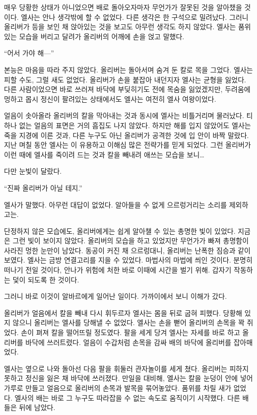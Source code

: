 매우 당황한 상태가 아니었으면 배로 돌아오자마자 무언가가 잘못된 것을 알아챘을 것이다. 엘사는 안나 생각밖에 할 수 없었다. 다른 생각은 한 구석으로 밀려났다. 그러니 올리버가 등을 보인 채 앉아있는 것을 보고도 아무런 생각도 하지 않았다. 엘사는 품위 있는 모습을 버리고 달려가 올리버의 어깨에 손을 얹고 말했다.

``어서 가야 해—''

본능은 마음을 따라 주지 않았다. 올리버는 돌아서며 숨겨 둔 칼로 목을 그었다. 엘사는 피할 수도, 그럴 새도 없었다. 올리버가 손을 붙잡아 내던지자 엘사는 균형을 잃었다. 다른 사람이었으면 바로 쓰러져 바닥에 부딪히기도 전에 목숨을 잃었겠지만, 두려움에 멍하고 몹시 정신이 팔려있는 상태에서도 엘사는 여전히 엘사 여왕이었다.

얼음이 솟아올라 올리버의 칼을 막아내는 것과 동시에 엘사는 비틀거리며 물러났다. 티 하나 없는 얼음의 표면은 거의 흠집도 나지 않았다. 하지만 해를 입지 않았어도 엘사는 죽을 지경에 이른 것과, 다른 누구도 아닌 올리버가 공격한 것에 입 안이 바짝 말랐다. 지난 며칠 동안 엘사는 이 유용하고 이해심 많은 전략가를 믿게 되었다. 그런 올리버가 이런 때에 엘사를 죽이려 드는 것과 칼을 빼내려 애쓰는 모습을 보니\ldots

다만 눈빛이 달랐다.

``진짜 올리버가 아닐 테지.''

엘사가 말했다. 아무런 대답이 없었다. 알아들을 수 없게 으르렁거리는 소리를 제외하고는.

단정하지 않은 모습에도, 올리버에게는 쉽게 알아챌 수 있는 총명한 빛이 있었다. 지금은 그런 빛이 보이지 않았다. 올리버의 모습을 하고 있었지만 무언가가 빠져 총명함이 사라진 멍한 눈만이 남았다. 동공이 커진 채 으르렁대니, 올리버는 난폭한 짐승과 같이 보였다. 엘사는 금방 연결고리를 지을 수 있었다. 마법사의 마법에 씌인 것이다. 분명히 떠나기 전일 것이다, 안나가 위험에 처한 바로 이때에 시간을 벌기 위해. 갑자기 작동하는 덫이 되도록 한 것이다.

그러니 바로 이것이 알바르에게 일어난 일이다. 가까이에서 보니 이해가 갔다.

올리버가 얼음에서 칼을 빼내 다시 휘두르자 엘사는 몸을 뒤로 굽혀 피했다. 당황해 있지 않으니 올리버는 엘사를 당해낼 수 없었다. 엘사는 손을 뻗어 올리버의 손목을 꽉 쥐었다. 손이 펴져 칼을 떨어뜨릴 정도였다. 팔을 세게 당겨 엘사는 자세를 바로 하고 올리버를 바닥에 쓰러트렸다. 얼음이 수갑처럼 손목을 감싸 배의 바닥에 올리버를 잡아매었다.

엘사는 옆으로 나와 돌아선 다음 팔을 휘둘러 관자놀이를 세게 쳤다. 올리버는 피하지 못하고 정신을 잃은 채 바닥에 쓰러졌다. 만일을 대비해, 엘사는 칼을 눈덩이 안에 넣어 가루로 만들고 얼음으로 올리버의 손목과 발목을 묶어놓았다. 품위를 차릴 새가 없었다. 엘사의 배는 바로 그 누구도 따라잡을 수 없는 속도로 움직이기 시작했다. 다른 배들은 뒤에 남았다.

